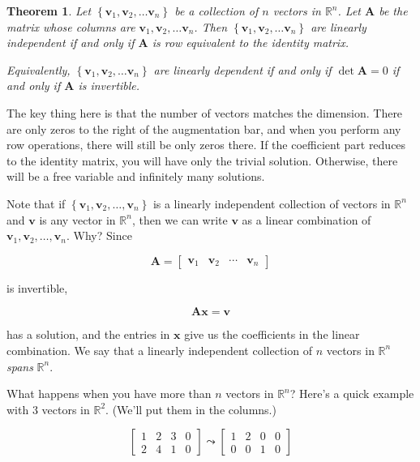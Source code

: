 \documentclass[
]{book}
\newtheorem{theorem}{Theorem}[chapter]
\theoremstyle{definition}
\theoremstyle{definition}
\theoremstyle{definition}
\theoremstyle{definition}
\theoremstyle{remark}
\begin{document}
\begin{theorembox}

\begin{theorem}
Let \(\left\{\mathbf{v}_1,\mathbf{v}_2,\dots\mathbf{v}_n\right\}\) be a collection of \(n\) vectors in \(\mathbb{R}^n\). Let \(\mathbf{A}\) be the matrix whose columns are \(\mathbf{v}_1,\mathbf{v}_2,\dots\mathbf{v}_n\). Then \(\left\{\mathbf{v}_1,\mathbf{v}_2,\dots\mathbf{v}_n\right\}\) are linearly \emph{independent} if and only if \(\mathbf{A}\) is row equivalent to the identity matrix.

Equivalently, \(\left\{\mathbf{v}_1,\mathbf{v}_2,\dots\mathbf{v}_n\right\}\) are linearly \emph{dependent} if and only if \(\det\mathbf{A}=0\) if and only if \(\mathbf{A}\) is invertible.
\end{theorem}

\end{theorembox}

The key thing here is that the number of vectors matches the dimension. There are only zeros to the right of the augmentation bar, and when you perform any row operations, there will still be only zeros there. If the coefficient part reduces to the identity matrix, you will have only the trivial solution. Otherwise, there will be a free variable and infinitely many solutions.

Note that if \(\left\{\mathbf{v}_1,\mathbf{v}_2,\dots,\mathbf{v}_n\right\}\) is a linearly independent collection of vectors in \(\mathbb{R}^n\) and \(\mathbf{v}\) is any vector in \(\mathbb{R}^n\), then we can write \(\mathbf{v}\) as a linear combination of \(\mathbf{v}_1,\mathbf{v}_2,\dots,\mathbf{v}_n\). Why? Since

\[\mathbf{A}=\begin{bmatrix} \mathbf{v}_1 & \mathbf{v}_2 & \cdots & \mathbf{v}_n\end{bmatrix}\]

is invertible,

\[\mathbf{A}\mathbf{x}=\mathbf{v}\]

has a solution, and the entries in \(\mathbf{x}\) give us the coefficients in the linear combination. We say that a linearly independent collection of \(n\) vectors in \(\mathbb{R}^n\) \emph{spans} \(\mathbb{R}^n\).

What happens when you have more than \(n\) vectors in \(\mathbb{R}^n\)? Here's a quick example with 3 vectors in \(\mathbb{R}^2\). (We'll put them in the columns.)

\[\left[\begin{array}{rrr|r} 1 & 2 & 3 & 0\\ 2 & 4 & 1 & 0\end{array}\right]\leadsto \left[\begin{array}{rrr|r}1 & 2 & 0 & 0\\0 & 0 & 1 & 0\end{array}\right]\]
\end{document}
